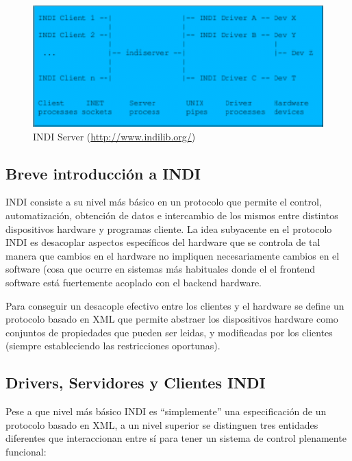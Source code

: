 \bigskip
\begin{figure}[!ht]
  \begin{center}
    \includegraphics[width=1\textwidth]{../images/Indi_server.png}
    \caption{INDI Server (\url{http://www.indilib.org/})}
    \label{fig:indi_server}
  \end{center}
\end{figure}

\bigskip

\subsection{Breve introducción a INDI}

INDI consiste a su nivel más básico en un protocolo que permite el control, automatización, obtención de datos e intercambio de los mismos entre distintos dispositivos hardware y programas cliente. La idea subyacente en el protocolo INDI es desacoplar aspectos específicos del hardware que se controla de tal manera que cambios en el hardware no impliquen necesariamente cambios en el software (cosa que ocurre en sistemas más habituales donde el el frontend software está fuertemente acoplado con el backend hardware.

\bigskip
Para conseguir un desacople efectivo entre los clientes y el hardware se define un protocolo basado en XML que permite abstraer los dispositivos hardware como conjuntos de propiedades que pueden ser leidas, y modificadas por los clientes (siempre estableciendo las restricciones oportunas).


\subsection{Drivers, Servidores y Clientes INDI}

Pese a que nivel más básico INDI es ``simplemente'' una especificación de un protocolo basado en XML, a un nivel superior se distinguen tres entidades diferentes que interaccionan entre sí para tener un sistema de control plenamente funcional:

